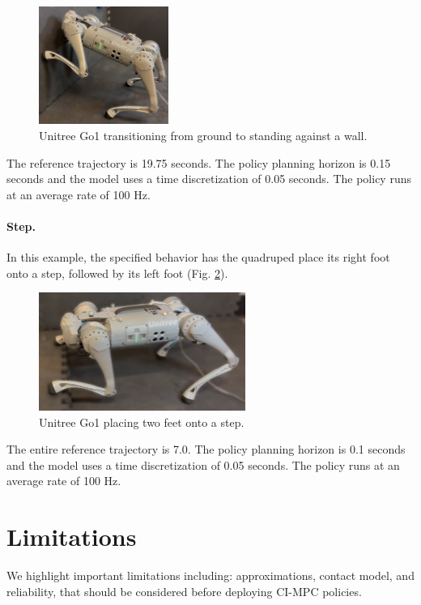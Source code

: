 \begin{figure}[H]
	\centering
	\includegraphics[height=3.85cm]{ci_pc/cipc_quadruped_wallstand_blur.png}
	\caption[Unitree Go1 transitioning from ground to standing against a wall]{Unitree Go1 transitioning from ground to standing against a wall.}
	\label{cipc_quadruped_hardware_wall}
\end{figure}
The reference trajectory is 19.75 seconds. The policy planning horizon is 0.15 seconds and the model uses a time discretization of 0.05 seconds. The policy runs at an average rate of 100 Hz.

\paragraph{Step.}
In this example, the specified behavior has the quadruped place its right foot onto a step, followed by its left foot (Fig. \ref{cipc_quadruped_hardware_step}). 

\begin{figure}[H]
	\centering
	\includegraphics[height=3.85cm]{ci_pc/cipc_quadruped_step_blur.png}
	\caption[Unitree Go1 placing two feet onto a step]{Unitree Go1 placing two feet onto a step.}
	\label{cipc_quadruped_hardware_step}
\end{figure}
The entire reference trajectory is 7.0. The policy planning horizon is 0.1 seconds and the model uses a time discretization of 0.05 seconds. The policy runs at an average rate of 100 Hz.

\section{Limitations} \label{cipc_limitations}
We highlight important limitations including: approximations, contact model, and reliability, that should be considered before deploying CI-MPC policies.

